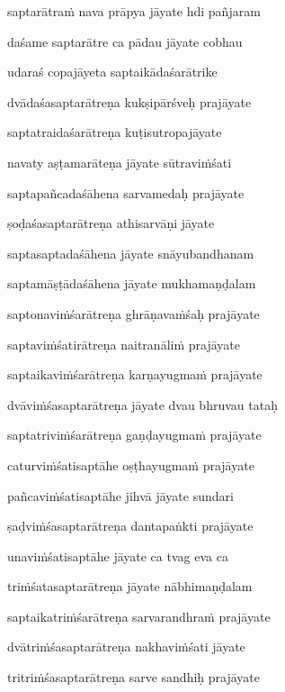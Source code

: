 saptarātra\.m nava prāpya jāyate hdi pañjaram \veg\dontdisplaylinenum

daśame saptarātre ca pādau jāyate cobhau\thinspace{\dandab} \dontdisplaylinenum

udaraś copajāyeta saptaikādaśarātrike \veg\dontdisplaylinenum

dvādaśasaptarātreṇa kukṣipārśveḥ prajāyate\thinspace{\dandab} \dontdisplaylinenum

saptatraidaśarātreṇa kuṭisutropajāyate \veg\dontdisplaylinenum

navaty aṣṭamarāteṇa jāyate sūtravi\.mśati\thinspace{\dandab} \dontdisplaylinenum

saptapañcadaśāhena sarvamedaḥ prajāyate \veg\dontdisplaylinenum

ṣoḍaśasaptarātreṇa athisarvāṇi jāyate\thinspace{\dandab} \dontdisplaylinenum

saptasaptadaśāhena jāyate snāyubandhanam \veg\dontdisplaylinenum

saptamāṣṭādaśāhena jāyate mukhamaṇḍalam\thinspace{\dandab} \dontdisplaylinenum

saptonavi\.mśarātreṇa ghrāṇava\.mśaḥ prajāyate \veg\dontdisplaylinenum

saptavi\.mśatirātreṇa naitranāli\.m prajāyate\thinspace{\dandab} \dontdisplaylinenum

saptaikavi\.mśarātreṇa karṇayugma\.m prajāyate \veg\dontdisplaylinenum

dvāvi\.mśasaptarātreṇa jāyate dvau bhruvau tataḥ\thinspace{\dandab} \dontdisplaylinenum

saptatrivi\.mśarātreṇa gaṇḍayugma\.m prajāyate \veg\dontdisplaylinenum

caturvi\.mśatisaptāhe oṣṭhayugma\.m prajāyate\thinspace{\dandab} \dontdisplaylinenum

pañcavi\.mśatisaptāhe jihvā jāyate sundari \veg\dontdisplaylinenum

ṣaḍvi\.mśasaptarātreṇa dantapaṅkti prajāyate\thinspace{\dandab} \dontdisplaylinenum

unavi\.mśatisaptāhe jāyate ca tvag eva ca \veg\dontdisplaylinenum

tri\.mśatasaptarātreṇa jāyate nābhimaṇḍalam\thinspace{\dandab} \dontdisplaylinenum

saptaikatri\.mśarātreṇa sarvarandhra\.m prajāyate \veg\dontdisplaylinenum

dvātri\.mśasaptarātreṇa nakhavi\.mśati jāyate\thinspace{\dandab} \dontdisplaylinenum

tritri\.mśasaptarātreṇa sarve sandhiḥ prajāyate \veg\dontdisplaylinenum

